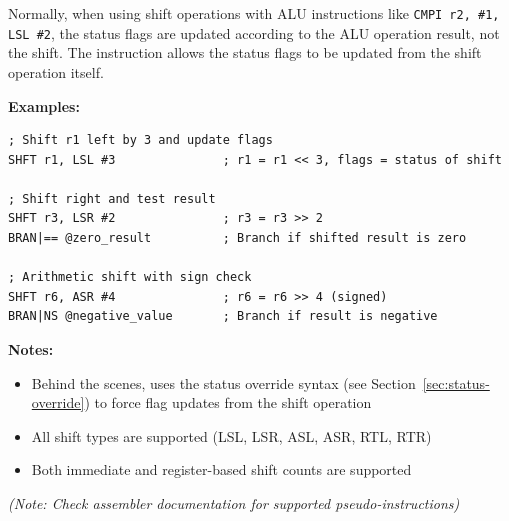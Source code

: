 Normally, when using shift operations with ALU instructions like \texttt{CMPI r2, \#1, LSL \#2}, the status flags are
updated according to the ALU operation result, not the shift. The  instruction allows the status flags
to be updated from the shift operation itself.

\textbf{Examples:}
\begin{lstlisting}
; Shift r1 left by 3 and update flags
SHFT r1, LSL #3               ; r1 = r1 << 3, flags = status of shift

; Shift right and test result
SHFT r3, LSR #2               ; r3 = r3 >> 2
BRAN|== @zero_result          ; Branch if shifted result is zero

; Arithmetic shift with sign check
SHFT r6, ASR #4               ; r6 = r6 >> 4 (signed)
BRAN|NS @negative_value       ; Branch if result is negative
\end{lstlisting}

\textbf{Notes:}
\begin{itemize}
	\item Behind the scenes,  uses the status override syntax (see Section~\ref{sec:status-override}) to force
	      flag updates from the shift operation
	\item All shift types are supported (LSL, LSR, ASL, ASR, RTL, RTR)
	\item Both immediate and register-based shift counts are supported
\end{itemize}

\textit{(Note: Check assembler documentation for supported pseudo-instructions)}
